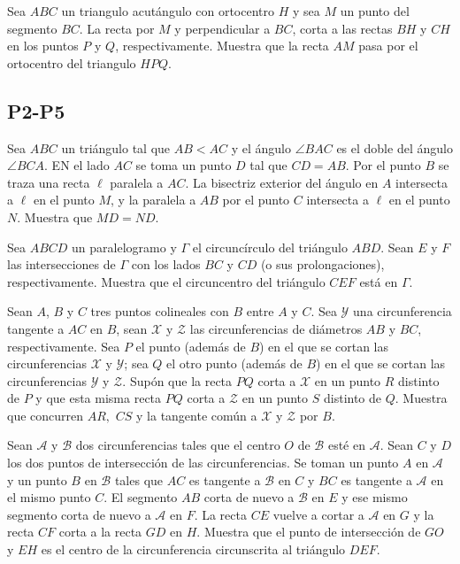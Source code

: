 \documentclass[11pt]{scrartcl}
\begin{document}
\begin{problem} [2024/4]
    Sea $ABC$ un triangulo acutángulo con ortocentro $H$ y sea $M$ un punto del segmento $BC$. La recta por $M$ y perpendicular a $BC$, corta a las rectas $BH$ y $CH$ en los puntos $P$ y $Q$, respectivamente. Muestra que la recta $AM$ pasa por el ortocentro del triangulo $HPQ$.
\end{problem}

\subsection{P2-P5}
\begin{problem} [2001/5] 
    Sea $ABC$ un triángulo tal que $AB< AC$ y el ángulo $\angle BAC$ es el doble del ángulo $\angle BCA$. EN el lado $AC$ se toma un punto $D$ tal que $CD=AB$. Por el punto $B$ se traza una recta $\ell$ paralela a $AC$. La bisectriz exterior del ángulo en $A$ intersecta a $\ell$ en el punto $M$, y la paralela a $AB$ por el punto $C$ intersecta a $\ell$ en el punto $N$. Muestra que $MD=ND$.
    \end{problem}
\begin{problem} [2002/2]
    Sea $ABCD$ un paralelogramo y $\Gamma$ el circuncírculo del triángulo $ABD$. Sean $E$ y $F$ las intersecciones de $\Gamma$ con los lados $BC$ y $CD$ (o sus prolongaciones), respectivamente. Muestra que el circuncentro del triángulo $CEF$ está en $\Gamma$.
  \end{problem}
\begin{problem} [2003/2] 
    Sean $A$, $B$ y $C$ tres puntos colineales con $B$ entre $A$ y $C$. Sea $\mathcal{Y}$ una circunferencia tangente a $AC$ en $B$, sean $\mathcal{X}$ y $\mathcal{Z}$ las circunferencias de diámetros $AB$ y $BC$, respectivamente. Sea $P$ el punto (además de $B$) en el que se cortan las circunferencias $\mathcal{X}$ y $\mathcal{Y}$; sea $Q$ el otro punto (además de $B$) en el que se cortan las circunferencias $\mathcal{Y}$ y $\mathcal{Z}$. Supón que la recta $PQ$ corta a $\mathcal{X}$ en un punto $R$ distinto de $P$ y que esta misma recta $PQ$ corta a $\mathcal{Z}$ en un punto $S$ distinto de $Q$. Muestra que concurren $AR,$ $CS$ y la tangente común a $\mathcal{X}$ y $\mathcal{Z}$ por $B$.
    \end{problem}
\begin{problem} [2004/5] 
    Sean $\mathcal{A}$ y $\mathcal{B}$ dos circunferencias tales que el centro $O$ de $\mathcal{B}$ esté en $\mathcal{A}$. Sean $C$ y $D$ los dos puntos de intersección de las circunferencias. Se toman un punto $A$ en $\mathcal{A}$ y un punto $B$ en $\mathcal{B}$ tales que $AC$ es tangente a $\mathcal{B}$ en $C$ y $BC$ es tangente a $\mathcal{A}$ en el mismo punto $C$. El segmento $AB$ corta de nuevo a $\mathcal{B}$ en $E$ y ese mismo segmento corta de nuevo a $\mathcal{A}$ en $F$. La recta $CE$ vuelve a cortar a $\mathcal{A}$ en $G$ y la recta $CF$ corta a la recta $GD$ en $H$. Muestra que el punto de intersección de $GO$ y $EH$ es el centro de la circunferencia circunscrita al triángulo $DEF$.
   \end{problem}
\end{document}
